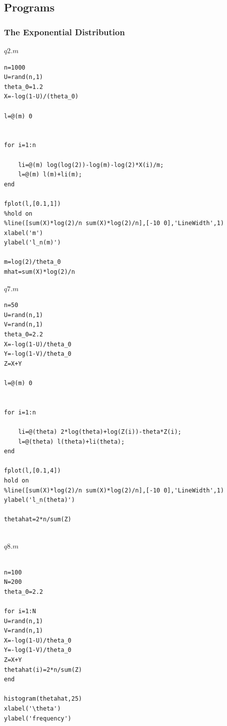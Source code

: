 \documentclass[10pt,a4paper]{report}
\begin{document}
\clearpage

\subsection*{Programs}

\subsubsection*{The Exponential Distribution}

$q2.m$

\begin{verbatim}
n=1000
U=rand(n,1)
theta_0=1.2
X=-log(1-U)/(theta_0)

l=@(m) 0


for i=1:n
    
    li=@(m) log(log(2))-log(m)-log(2)*X(i)/m;
    l=@(m) l(m)+li(m);  
end

fplot(l,[0.1,1])
%hold on
%line([sum(X)*log(2)/n sum(X)*log(2)/n],[-10 0],'LineWidth',1)
xlabel('m')
ylabel('l_n(m)')

m=log(2)/theta_0
mhat=sum(X)*log(2)/n
\end{verbatim}

\vspace{5mm}

$q7.m$

\begin{verbatim}
n=50
U=rand(n,1)
V=rand(n,1)
theta_0=2.2
X=-log(1-U)/theta_0
Y=-log(1-V)/theta_0
Z=X+Y

l=@(m) 0


for i=1:n
    
    li=@(theta) 2*log(theta)+log(Z(i))-theta*Z(i);
    l=@(theta) l(theta)+li(theta);  
end

fplot(l,[0.1,4])
hold on
%line([sum(X)*log(2)/n sum(X)*log(2)/n],[-10 0],'LineWidth',1)
ylabel('l_n(theta)')

thetahat=2*n/sum(Z)
	
\end{verbatim}

\vspace{5mm}

$q8.m$

\begin{verbatim}

n=100
N=200
theta_0=2.2

for i=1:N
U=rand(n,1)
V=rand(n,1)
X=-log(1-U)/theta_0
Y=-log(1-V)/theta_0
Z=X+Y
thetahat(i)=2*n/sum(Z)
end

histogram(thetahat,25)
xlabel('\theta')
ylabel('frequency')

\end{verbatim}
\end{document}
